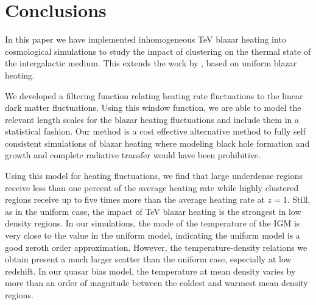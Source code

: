 \documentclass[numberedappendix]{emulateapj}
\begin{document}
\section{Conclusions}
In this paper we have implemented inhomogeneous TeV blazar heating into cosmological simulations to study the impact of clustering on the thermal state of the intergalactic medium. This extends the work by \citet{2012ApJ...752...23C,2012MNRAS.423..149P}, based on uniform blazar heating.

We developed a filtering function relating heating rate fluctuations to the linear dark matter fluctuations. Using this window function, we are able to model the relevant length scales for the blazar heating fluctuations and include them in a statistical fashion. Our method is a cost effective alternative method to fully self consistent simulations of blazar heating where modeling black hole formation and growth and complete radiative transfer would have been prohibitive.

Using this model for heating fluctuations, we find that large underdense regions receive less than one percent of the average heating rate while highly clustered regions receive up to five times more than the average heating rate at $z=1$. Still, as in the uniform case, the impact of TeV blazar heating is the strongest in low density regions. In our simulations, the mode of the temperature of the IGM is very close to the value in the uniform model, indicating the uniform model is a good zeroth order approximation. However, the temperature-density relations we obtain present a much larger scatter than the uniform case, especially at low redshift. In our quasar bias model, the temperature at mean density varies by more than an order of magnitude between the coldest and warmest mean density regions.
\end{document}
